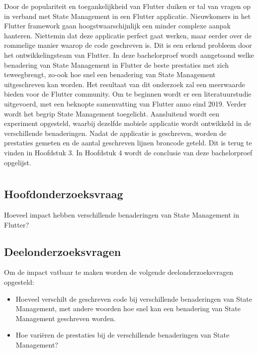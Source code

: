 Door de populariteit en toegankelijkheid van Flutter duiken er tal van vragen op in verband met State Management in een Flutter applicatie. Nieuwkomers in het Flutter framework gaan hoogstwaarschijnlijk een minder complexe aanpak hanteren. Niettemin dat deze applicatie perfect gaat werken, maar eerder over de rommelige manier waarop de code geschreven is. Dit is een erkend probleem door het ontwikkelingsteam van Flutter.
\newline
In deze bachelorproef wordt aangetoond welke benadering van State Management in Flutter de beste prestaties met zich teweegbrengt, zo-ook hoe snel een benadering van State Management uitgeschreven kan worden. Het resultaat van dit onderzoek zal een meerwaarde bieden voor de Flutter community. Om te beginnen wordt er een literatuurstudie uitgevoerd, met een beknopte samenvatting van Flutter anno eind 2019. Verder wordt het begrip State Management toegelicht. Aansluitend wordt een experiment opgesteld, waarbij dezelfde mobiele applicatie wordt ontwikkeld in de verschillende benaderingen. Nadat de applicatie is geschreven, worden de prestaties gemeten en de aantal geschreven lijnen broncode geteld. Dit is terug te vinden in Hoofdstuk 3.
\newline
In Hoofdstuk 4 wordt de conclusie van deze bachelorproef opgelijst.

\section{}
\label{sec:onderzoeksvraag}

\subsection{Hoofdonderzoeksvraag}
Hoeveel impact hebben verschillende benaderingen van State Management in Flutter?

\subsection{Deelonderzoeksvragen}
Om de impact vatbaar te maken worden de volgende deelonderzoeksvragen opgesteld:
\begin{itemize}
    \item Hoeveel verschilt de geschreven code bij verschillende benaderingen van State Management, met andere woorden
    hoe snel kan een benadering van State Management geschreven worden.
    \item{Hoe variëren de prestaties bij de verschillende benaderingen van State Management?}
\end{itemize}

